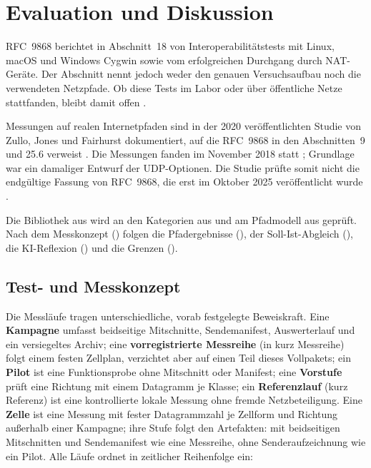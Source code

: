 
\chapter{Evaluation und Diskussion}
\label{chap:evaluation}

RFC~9868 berichtet in Abschnitt~18 von Interoperabilitätstests mit Linux, macOS und Windows Cygwin sowie
vom erfolgreichen Durchgang durch NAT-Geräte. Der Abschnitt nennt jedoch weder den genauen Versuchsaufbau
noch die verwendeten Netzpfade. Ob diese Tests im Labor oder über öffentliche Netze stattfanden, bleibt
damit offen \cite[Sec.~18]{rfc9868}.

Messungen auf realen Internetpfaden sind in der 2020 veröffentlichten Studie von Zullo, Jones und
Fairhurst dokumentiert, auf die RFC~9868 in den Abschnitten~9 und 25.6 verweist
\cite[Sec.~9 und 25.6]{rfc9868}. Die Messungen fanden im November 2018 statt
\cite[Sec.~III und IV]{zullo2020sorrows}; Grundlage war ein damaliger Entwurf der UDP-Optionen.
Die Studie prüfte somit nicht die endgültige Fassung von RFC~9868, die erst im Oktober 2025 veröffentlicht
wurde \cite{rfc9868}.

Die Bibliothek aus  wird an den Kategorien aus  und am
Pfadmodell aus  geprüft. Nach dem Messkonzept () folgen
die Pfadergebnisse (), der Soll-Ist-Abgleich (), die
KI-Reflexion () und die Grenzen ().

\section{Test- und Messkonzept}
\label{sec:testkonzept}

Die Messläufe tragen unterschiedliche, vorab festgelegte Beweiskraft. Eine \textbf{Kampagne} umfasst beidseitige
Mitschnitte, Sendemanifest, Auswerterlauf und ein versiegeltes Archiv; eine \textbf{vorregistrierte Messreihe} (in
 kurz Messreihe) folgt einem festen Zellplan, verzichtet aber auf einen Teil dieses
Vollpakets; ein \textbf{Pilot} ist eine Funktionsprobe ohne Mitschnitt oder Manifest; eine \textbf{Vorstufe} prüft eine
Richtung mit einem Datagramm je Klasse; ein \textbf{Referenzlauf} (kurz Referenz) ist eine kontrollierte lokale Messung
ohne fremde Netzbeteiligung. Eine \textbf{Zelle} ist eine Messung mit fester Datagrammzahl je Zellform und Richtung
außerhalb einer Kampagne; ihre Stufe folgt den Artefakten: mit beidseitigen Mitschnitten und Sendemanifest wie eine
Messreihe, ohne Senderaufzeichnung wie ein Pilot. Alle Läufe ordnet  in zeitlicher
Reihenfolge ein:

